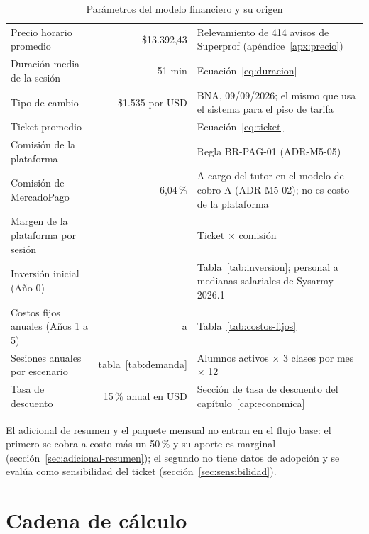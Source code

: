 \begin{table}[H]
    \centering
    \caption{Parámetros del modelo financiero y su origen}
    \label{tab:parametros-modelo}
    \small
    \begin{tabularx}{\textwidth}{L r L}
        \toprule
         &  &  \\
        \midrule
        Precio horario promedio & \$13.392,43 & Relevamiento de 414 avisos de Superprof (apéndice~\ref{apx:precio}) \\
        Duración media de la sesión & 51 min & Ecuación~\ref{eq:duracion} \\
        Tipo de cambio & \$1.535 por USD & BNA, 09/09/2026; el mismo que usa el sistema para el piso de tarifa \\
        Ticket promedio &  & Ecuación~\ref{eq:ticket} \\
        Comisión de la plataforma & \comision{} & Regla BR-PAG-01 (ADR-M5-05) \\
        Comisión de MercadoPago & 6,04\,\% & A cargo del tutor en el modelo de cobro A (ADR-M5-02); no es costo de la plataforma \\
        Margen de la plataforma por sesión &  & Ticket $\times$ comisión \\
        Inversión inicial (Año 0) &  & Tabla~\ref{tab:inversion}; personal a medianas salariales de Sysarmy 2026.1 \\
        Costos fijos anuales (Años 1 a 5) &  a  & Tabla~\ref{tab:costos-fijos} \\
        Sesiones anuales por escenario & tabla~\ref{tab:demanda} & Alumnos activos $\times$ 3 clases por mes $\times$ 12 \\
        Tasa de descuento & 15\,\% anual en USD & Sección de tasa de descuento del capítulo~\ref{cap:economica} \\
        \bottomrule
    \end{tabularx}
\end{table}

El adicional de resumen y el paquete mensual no entran en el flujo base:
el primero se cobra a costo más un 50\,\% y su aporte es marginal
(sección~\ref{sec:adicional-resumen}); el segundo no tiene datos de
adopción y se evalúa como sensibilidad del ticket
(sección~\ref{sec:sensibilidad}).

\section{Cadena de cálculo}


